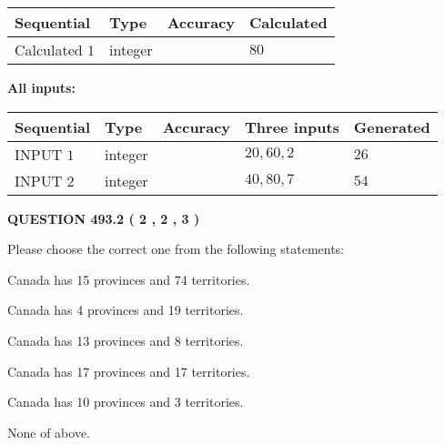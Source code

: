 \documentclass[12pt]{article}
\begin{document}
   
   
   
\noindent{}
   
   
  
  
\noindent\begin{tabular}{|l|l|l|l|}
\hline
 Sequential & Type & Accuracy & Calculated \\ 
\hline
 
 
  Calculated $  1 $ & integer &  & 
  $ 80 $ 
 \\  \hline  
 \end{tabular}
   
   
   
   
\noindent\vspace{0.1in}\hspace{-0.08in} {\textbf{\Large{All inputs: }}}
   
   
  
  
\noindent\begin{tabular}{|l|l|l|l|l|}
\hline
 Sequential & Type & Accuracy & Three inputs & Generated \\ 
\hline
 
 
  INPUT $  1 $ & integer &  & $
 20
 , 
 60
 , 
 2
 $ & $ 26 $ 
 \\  \hline  
 
 
  INPUT $  2 $ & integer &  & $
 40
 , 
 80
 , 
 7
 $ & $ 54 $ 
 \\  \hline  
 \end{tabular}
   
   
  
\vspace{0.2in}
  
{\textbf{\Large{QUESTION
493.2 
 ( 2 , 2 , 3 )
}}}
  
  
Please choose the correct one from the following statements:
 
 
Canada has  15 provinces and  74 territories.
 
 
Canada has   4 provinces and  19 territories.
 
 
Canada has  13 provinces and  8 territories.
 
 
Canada has  17 provinces and  17 territories.
 
 
Canada has 10  provinces and 3 territories.
 
 
 None of above.
 
\end{document}
